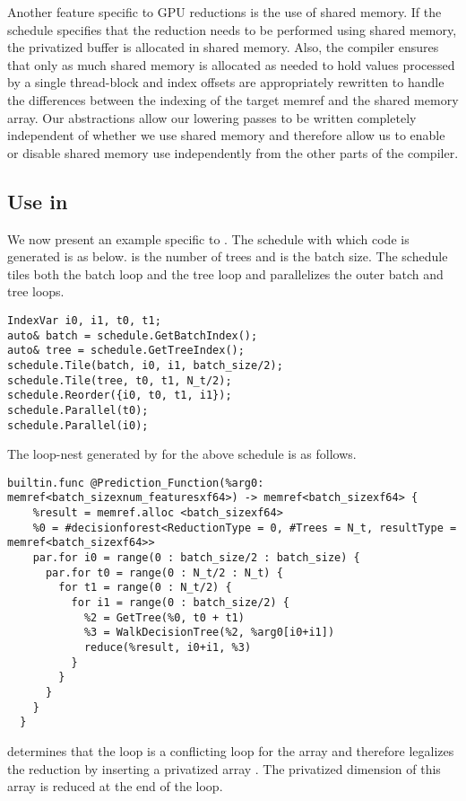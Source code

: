 Another feature specific to GPU reductions is the use of shared memory. 
If the schedule specifies that the reduction needs to be performed 
using shared memory, the privatized buffer is allocated in shared memory. 
Also, the compiler ensures that only as much shared memory is allocated 
as needed to hold values processed by a single thread-block and 
index offsets are appropriately rewritten to handle the differences between 
the indexing of the target memref and the shared memory array.
Our abstractions allow our lowering passes to be written completely 
independent of whether we use shared memory and therefore allow 
us to enable or disable shared memory use independently from the other 
parts of the compiler. 


\subsection{Use in \Treebeard{}}
We now present an example specific to \Treebeard{}. The schedule with
which code is generated is as below.  is the number of trees 
and  is the batch size. The schedule tiles both the 
batch loop and the tree loop and parallelizes the outer batch 
and tree loops.

\begin{lstlisting}[style=c++]
IndexVar i0, i1, t0, t1;
auto& batch = schedule.GetBatchIndex();
auto& tree = schedule.GetTreeIndex();
schedule.Tile(batch, i0, i1, batch_size/2);
schedule.Tile(tree, t0, t1, N_t/2);
schedule.Reorder({i0, t0, t1, i1});
schedule.Parallel(t0);
schedule.Parallel(i0);
\end{lstlisting}

The loop-nest generated by \Treebeard{} for the above schedule is as follows. 
\begin{lstlisting}[style=c++]
  builtin.func @Prediction_Function(%arg0: memref<batch_sizexnum_featuresxf64>) -> memref<batch_sizexf64> {
    %result = memref.alloc <batch_sizexf64>
    %0 = #decisionforest<ReductionType = 0, #Trees = N_t, resultType = memref<batch_sizexf64>> 
    par.for i0 = range(0 : batch_size/2 : batch_size) {
      par.for t0 = range(0 : N_t/2 : N_t) {
        for t1 = range(0 : N_t/2) {
          for i1 = range(0 : batch_size/2) {
            %2 = GetTree(%0, t0 + t1) 
            %3 = WalkDecisionTree(%2, %arg0[i0+i1])
            reduce(%result, i0+i1, %3)
          }
        }
      }
    }
  }
\end{lstlisting}

\Treebeard{} determines that the  loop is a conflicting loop for the 
array and therefore legalizes the reduction by inserting a privatized array 
. The privatized dimension of this array is reduced at the end 
of the  loop.

